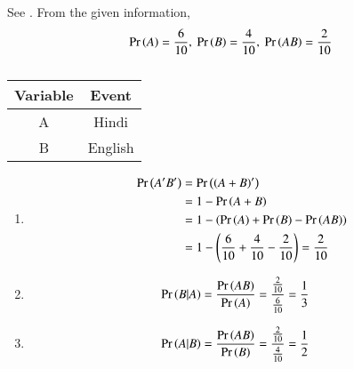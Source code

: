 See .  From the given information,
\begin{align}
\Pr\left(A\right)=\frac{6}{10},\
\Pr\left(B\right)=\frac{4}{10},\
\Pr\left(AB\right) 
=\frac{2}{10}
\end{align}
\begin{table}[htb] %
\centering
\begin{tabular}{|c|c|}
\hline
\textbf{Variable} & \textbf{Event} \\
\hline
A & Hindi \\
\hline
B & English \\
\hline
\end{tabular}
\caption{}
\label{tab:variables-events}
\end{table}
\begin{enumerate}
\item
\begin{align}
\Pr\left(A^{\prime}B^{\prime}\right)&=\Pr\left(\left(A+B\right)^{\prime}\right)\\
&=1-\Pr\left(A+B\right)\\
&=1-\left(\Pr\left(A\right)+\Pr\left(B\right)-\Pr\left(AB\right)\right)\\
&=1-\left(\frac{6}{10}+\frac{4}{10}-\frac{2}{10}\right)
=\frac{2}{10}
\end{align}
\item
\begin{align}
\Pr\left(B|A\right)&=\frac{\Pr\left(AB\right)}{\Pr\left(A\right)}
=\frac{\frac{2}{10}}{\frac{6}{10}}
=\frac{1}{3}
\end{align}
\item 
\begin{align}
\Pr\left(A|B\right)&=\frac{\Pr\left(AB\right)}{\Pr\left(B\right)}
=\frac{\frac{2}{10}}{\frac{4}{10}}
=\frac{1}{2}
\end{align}
\end{enumerate}
